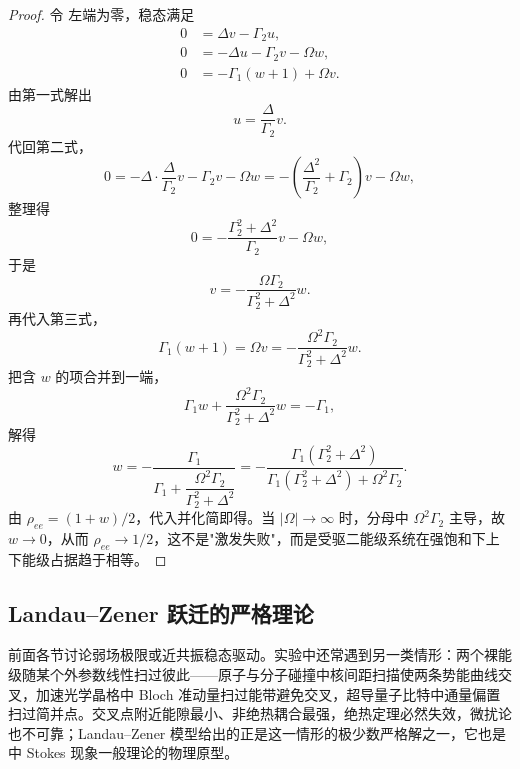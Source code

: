 \begin{proof}
令 左端为零，稳态满足
\begin{align*}
 0&=\Delta v-\Gamma_2 u,\\
 0&=-\Delta u-\Gamma_2 v-\Omega w,\\
 0&=-\Gamma_1(w+1)+\Omega v.
\end{align*}
由第一式解出
\begin{equation*}
 u=\frac{\Delta}{\Gamma_2}v.
\end{equation*}
代回第二式，
\begin{equation*}
 0=-\Delta\cdot\frac{\Delta}{\Gamma_2}v-\Gamma_2 v-\Omega w
 =-\left(\frac{\Delta^2}{\Gamma_2}+\Gamma_2\right)v-\Omega w,
\end{equation*}
整理得
\begin{equation*}
 0=-\frac{\Gamma_2^2+\Delta^2}{\Gamma_2}v-\Omega w,
\end{equation*}
于是
\begin{equation*}
 v=-\frac{\Omega\Gamma_2}{\Gamma_2^2+\Delta^2}w.
\end{equation*}
再代入第三式，
\begin{equation*}
 \Gamma_1(w+1)
 =\Omega v
 =-\frac{\Omega^2\Gamma_2}{\Gamma_2^2+\Delta^2}w.
\end{equation*}
把含 $w$ 的项合并到一端，
\begin{equation*}
 \Gamma_1 w+\frac{\Omega^2\Gamma_2}{\Gamma_2^2+\Delta^2}w
 =-\Gamma_1,
\end{equation*}
解得
\begin{equation*}
 w=-\frac{\Gamma_1}{\Gamma_1+\dfrac{\Omega^2\Gamma_2}{\Gamma_2^2+\Delta^2}}
 =-\frac{\Gamma_1(\Gamma_2^2+\Delta^2)}
 {\Gamma_1(\Gamma_2^2+\Delta^2)+\Omega^2\Gamma_2}.
\end{equation*}
由 $\rho_{ee}=(1+w)/2$，代入并化简即得。当 $|\Omega|\to\infty$ 时，分母中 $\Omega^2\Gamma_2$ 主导，故 $w\to0$，从而 $\rho_{ee}\to1/2$，这不是"激发失败"，而是受驱二能级系统在强饱和下上下能级占据趋于相等。
\end{proof}

\subsection{Landau--Zener 跃迁的严格理论}
\label{sec:lz-theory}

前面各节讨论弱场极限或近共振稳态驱动。实验中还常遇到另一类情形：两个裸能级随某个外参数线性扫过彼此——原子与分子碰撞中核间距扫描使两条势能曲线交叉，加速光学晶格中 Bloch 准动量扫过能带避免交叉，超导量子比特中通量偏置扫过简并点。交叉点附近能隙最小、非绝热耦合最强，绝热定理必然失效，微扰论也不可靠；Landau--Zener 模型给出的正是这一情形的极少数严格解之一，它也是中 Stokes 现象一般理论的物理原型。

